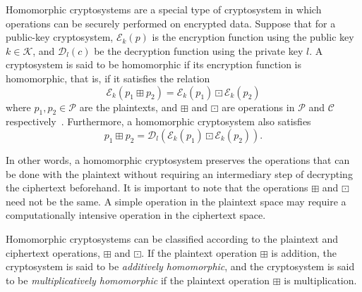 
Homomorphic cryptosystems are a special type of cryptosystem in which operations can be securely performed on encrypted data. Suppose that for a public-key cryptosystem, $\mathcal{E}_k \left(p \right)$ is the encryption function using the public key $k \in \mathcal{K}$, and $\mathcal{D}_l \left(c \right)$ be the decryption function using the private key $l$. A cryptosystem is said to be homomorphic if its encryption function is homomorphic, that is, if it satisfies the relation
\begin{equation}
    \mathcal{E}_k \left(p_1 \boxplus p_2\right) = \mathcal{E}_k \left(p_1\right) \boxdot \mathcal{E}_k \left(p_2\right)
\end{equation}
where $p_1, p_2 \in \mathcal{P}$ are the plaintexts, and $\boxplus$ and $\boxdot$ are operations in $\mathcal{P}$ and $\mathcal{C}$ respectively~\cite{fontaine_survey_2007}. Furthermore, a homomorphic cryptosystem also satisfies~\cite{li_elliptic_2012}
\begin{equation}
    p_1 \boxplus p_2 = \mathcal{D}_l \left( \mathcal{E}_k \left(p_1\right) \boxdot \mathcal{E}_k \left(p_2\right) \right).
\end{equation}

In other words, a homomorphic cryptosystem preserves the operations that can be done with the plaintext without requiring an intermediary step of decrypting the ciphertext beforehand. It is important to note that the operations $\boxplus$ and $\boxdot$ need not be the same. A simple operation in the plaintext space may require a computationally intensive operation in the ciphertext space.

Homomorphic cryptosystems can be classified according to the plaintext and ciphertext operations, $\boxplus$ and $\boxdot$. If the plaintext operation $\boxplus$ is addition, the cryptosystem is said to be \textit{additively homomorphic}, and the cryptosystem is said to be \textit{multiplicatively homomorphic} if the plaintext operation $\boxplus$ is multiplication.

